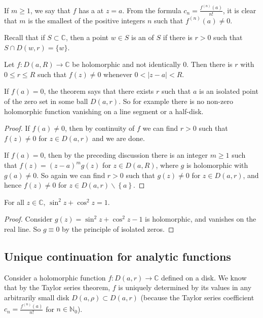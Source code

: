 \documentclass[egregdoesnotlikesansseriftitles,a4paper]{scrartcl}
\begin{document}
\begin{notation}
     If $m \geq 1$, we say that $f$ has a  at $z=a$. From the formula $c_{n}=\frac{f^{(n)}(a)}{n !}$, it is clear that $m$ is the smallest of the positive integers $n$ such that $f^{(n)}(a) \neq 0$.
\end{notation}
Recall that if $S \subset \mathbb{C}$, then a point $w \in S$ is an  of $S$ if there is $r>0$ such that $S \cap D(w, r)=\{w\}$.
\begin{theorem}
      Let $f: D (a,R)\rightarrow \mathbb{C}$ be holomorphic and not identically 0. Then there is $r$ with $0 \leq r \leq R$ such that $f (z) \neq 0$ whenever $0 < \left|z-a\right|<R$.
      \begin{remark}
          If $f (a)=0$, the theorem says that there exists $r$ such that $a$ is an isolated point of the zero set in some ball $D (a,r)$. So for example there is no non-zero holomorphic function vanishing on a line segment or a half-disk.
      \end{remark}
      \begin{proof}
            If $f (a)\neq 0$, then by continuity of $f$ we can find $r>0$ such that $f (z )\neq 0$ for $z \in D (a,r)$ and we are done.

            If $f (a)=0$, then by the preceding discussion there is an integer $m \geq 1$ such that $f (z)= (z-a)^{m} g (z)$ for $z \in D (a,R)$, where $g$ is holomorphic with $g (a)\neq 0$. So again we can find $r>0$ such that $g (z)\neq 0$ for $z \in D (a,r)$, and hence $f (z)\neq 0$ for $z \in D (a,r)\backslash \left\{a\right\}$. 
      \end{proof}
\end{theorem}
\begin{corollary}
      For all $z \in \mathbb{C}$, $\sin ^2 z+ \cos ^2z=1$.
      \begin{proof}
            Consider $g (z)=\sin ^2 z+ \cos ^2z-1 $ is holomorphic, and vanishes on the real line. So $g \equiv 0$ by the principle of isolated zeros.
      \end{proof}
\end{corollary}
\subsection{Unique continuation for analytic functions}
Consider a holomorphic function $f: D (a,r)\rightarrow \mathbb{C}$ defined on a disk. We know that by the Taylor series theorem, $f$ is uniquely determined by its values in any arbitrarily small disk $D (a,\rho )\subset D (a,r)$ (because the Taylor series coefficient $c_{n}= \frac{f^{(n)}(a)}{n!}$ for $n \in \mathbb{N}_{0}$).
\end{document}
